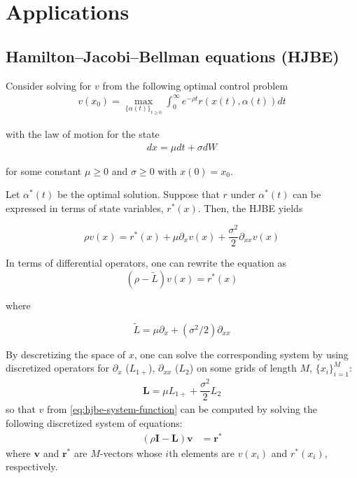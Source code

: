 \documentclass[11pt]{article}
\begin{document}
\section{Applications}

\subsection{Hamilton–Jacobi–Bellman equations (HJBE)}
Consider solving for $v$ from the following optimal control problem
\begin{align}
v(x_0) = \max_{ {\{\alpha(t) \} }_{t \geq 0} } \int_{0}^\infty e^{-\rho t} r( x(t), \alpha(t )) dt
\end{align}

with the law of motion for the state 
\begin{align}
dx = \mu dt + \sigma dW 
\end{align}


for some constant $\mu \geq 0$ and $\sigma \geq 0$ with $x(0) = x_0$.

Let $\alpha^*(t)$ be the optimal solution. Suppose that $r$ under $\alpha^*(t)$ can be expressed in terms of state variables, $r^* (x)$. Then, the HJBE yields

\begin{equation}\label{eq:hamilton-jacobi-bellman}
\rho v(x) = r^*(x) +  \mu  \partial_{x} v(x) + \dfrac{\sigma^2}{2} \partial_{xx} v(x)
\end{equation}

In terms of differential operators, one can rewrite the equation as
\begin{equation}\label{eq:hjbe-system-function}
(\rho -  \tilde{L} ) v(x) = r^*(x)
\end{equation}

where 

\begin{equation}\label{eq:L-defn}
\tilde{L} = \mu \partial_{x} + (\sigma^2/2) \partial_{xx}
\end{equation}


By descretizing the space of $x$, one can solve the corresponding system by using discretized operators for $\partial_{x}$ ($L_{1+}$), $\partial_{xx}$ ($L_2$) on some grids of length $M$, $\{x_i\}_{i=1}^M$:
\begin{align}\label{eq:L-descritized-defn}
\mathbf{L} = \mu L_{1+} + \dfrac{\sigma^2}{2} L_{2}
\end{align}
so that $v$ from \eqref{eq:hjbe-system-function} can be computed by solving the following discretized system of equations:
\begin{align}
(\rho \mathbf{I} - \mathbf{L}) \mathbf{v} &= \mathbf{r^*} 
\end{align}
where $\mathbf{v}$ and $\mathbf{r^*}$ are $M$-vectors whose $i$th elements are $v(x_i)$ and $r^*(x_i)$, respectively.
\end{document}
